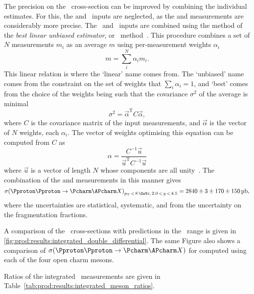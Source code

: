The precision on the \ccbar\ cross-section can be improved by combining the 
individual estimates.
For this, the \PDsplus and \PDstarp\ inputs are neglected, as the \PDzero and 
\PDplus measurements are considerably more precise.
The \PDzero\ and \PDplus\ inputs are combined using the method of the 
\emph{best linear unbiased estimator}, or \blue\ method~\cite{Lyons:1988rp}.
This procedure combines a set of $N$ measurements $m_{i}$ as an average $m$ 
using per-measurement weights $\alpha_{i}$
\begin{equation}
  m = \sum_{i}^{N} \alpha_{i}m_{i}.
  \label{eqn:results:blue}
\end{equation}
This linear relation is where the `linear' name comes from.
The `unbiased' name comes from the constraint on the set of weights that 
$\sum_{i}\alpha_{i} = 1$, and `best' comes from the choice of the weights being 
such that the covariance $\sigma^{2}$ of the average is minimal
\begin{equation}
  \sigma^{2} = \vec{\alpha}^{\text{T}}C\vec{\alpha},
  \label{eqn:results:blue_variance}
\end{equation}
where $C$ is the covariance matrix of the input measurements, and 
$\vec{\alpha}$ is the vector of $N$ weights, each $\alpha_{i}$.
The vector of weights optimising this equation can be computed from $C$ as
\begin{equation}
  \alpha = \frac{C^{-1}\vec{u}}{\vec{u}^{\text{T}}C^{-1}\vec{u}}
  \label{eqn:results:blue_weights}
\end{equation}
where $\vec{u}$ is a vector of length $N$ whose components are all 
unity~\cite{Lyons:1988rp}.
The combination of the \PDzero and \PDplus measurements in this manner gives
\begin{equation*}
  \xsec{(\ppToccbarX)}_{\pT\,<\,8\,\si{\GeVc},\,2.0\,<\,y\,<\,4.5} =
    \SI[parse-numbers=false]{2840 \pm 3 \pm 170 \pm 150}{\micro\barn},
\end{equation*}
where the uncertainties are statistical, systematic, and from the uncertainty 
on the fragmentation fractions.

A comparison of the \ccbar\ cross-sections with predictions in the \pT\ range 
 is given in 
\cref{fig:prod:results:integrated_double_differential}.
The same Figure also shows a comparison of $\xsec(\ppToccbarX)$ for 
 computed using each of the four open charm mesons.

Ratios of the integrated \xsectimesbfrac\ measurements are given in 
Table~\ref{tab:prod:results:integrated_meson_ratios}.

